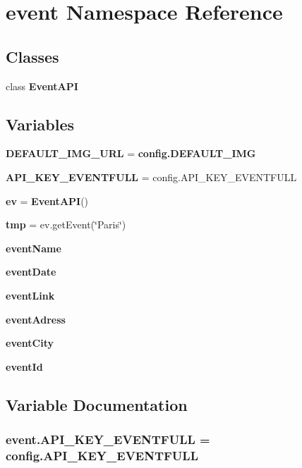 \section{event Namespace Reference}
\label{namespaceevent}
\subsection*{Classes}
\begin{DoxyCompactItemize}
\item 
class {\bf Event\+A\+PI}
\end{DoxyCompactItemize}
\subsection*{Variables}
\begin{DoxyCompactItemize}
\item 
{\bf D\+E\+F\+A\+U\+L\+T\+\_\+\+I\+M\+G\+\_\+\+U\+RL} = {\bf config.\+D\+E\+F\+A\+U\+L\+T\+\_\+\+I\+MG}
\item 
{\bf A\+P\+I\+\_\+\+K\+E\+Y\+\_\+\+E\+V\+E\+N\+T\+F\+U\+LL} = config.\+A\+P\+I\+\_\+\+K\+E\+Y\+\_\+\+E\+V\+E\+N\+T\+F\+U\+LL
\item 
{\bf ev} = {\bf Event\+A\+PI}()
\item 
{\bf tmp} = ev.\+get\+Event(\char`\"{}Paris\char`\"{})
\item 
{\bf event\+Name}
\item 
{\bf event\+Date}
\item 
{\bf event\+Link}
\item 
{\bf event\+Adress}
\item 
{\bf event\+City}
\item 
{\bf event\+Id}
\end{DoxyCompactItemize}


\subsection{Variable Documentation}
\subsubsection[{A\+P\+I\+\_\+\+K\+E\+Y\+\_\+\+E\+V\+E\+N\+T\+F\+U\+LL}]{\setlength{\rightskip}{0pt plus 5cm}event.\+A\+P\+I\+\_\+\+K\+E\+Y\+\_\+\+E\+V\+E\+N\+T\+F\+U\+LL = config.\+A\+P\+I\+\_\+\+K\+E\+Y\+\_\+\+E\+V\+E\+N\+T\+F\+U\+LL}\label{namespaceevent_a720562c2db2290f6f8e1996fef48ec53}
